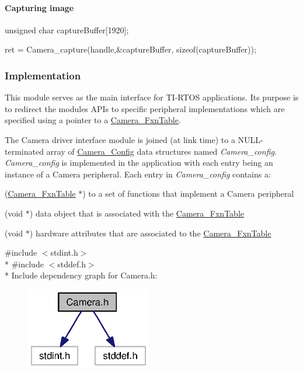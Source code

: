 \paragraph*{Capturing image}


\begin{DoxyCode}
\textcolor{keywordtype}{unsigned} \textcolor{keywordtype}{char} captureBuffer[1920];

ret = Camera_capture(handle,&captureBuffer, \textcolor{keyword}{sizeof}(captureBuffer));
\end{DoxyCode}


\subsubsection*{Implementation}

This module serves as the main interface for T\+I-\/\+R\+T\+O\+S applications. Its purpose is to redirect the module\textquotesingle{}s A\+P\+Is to specific peripheral implementations which are specified using a pointer to a \hyperlink{struct_camera___fxn_table}{Camera\+\_\+\+Fxn\+Table}.

The Camera driver interface module is joined (at link time) to a N\+U\+L\+L-\/terminated array of \hyperlink{struct_camera___config}{Camera\+\_\+\+Config} data structures named {\itshape Camera\+\_\+config}. {\itshape Camera\+\_\+config} is implemented in the application with each entry being an instance of a Camera peripheral. Each entry in {\itshape Camera\+\_\+config} contains a\+:
\begin{DoxyItemize}
\item (\hyperlink{struct_camera___fxn_table}{Camera\+\_\+\+Fxn\+Table} $\ast$) to a set of functions that implement a Camera peripheral
\item (void $\ast$) data object that is associated with the \hyperlink{struct_camera___fxn_table}{Camera\+\_\+\+Fxn\+Table}
\item (void $\ast$) hardware attributes that are associated to the \hyperlink{struct_camera___fxn_table}{Camera\+\_\+\+Fxn\+Table}
\end{DoxyItemize}



{\ttfamily \#include $<$stdint.\+h$>$}\\*
{\ttfamily \#include $<$stddef.\+h$>$}\\*
Include dependency graph for Camera.\+h\+:
\nopagebreak
\begin{figure}[H]
\begin{center}
\leavevmode
\includegraphics[width=155pt]{_camera_8h__incl}
\end{center}
\end{figure}
